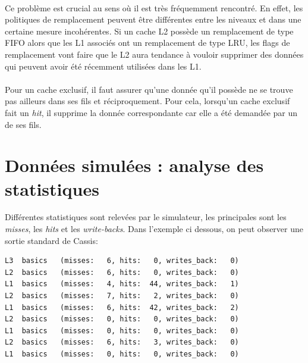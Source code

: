 \paragraph{}
Ce problème est crucial au sens où il est très fréquemment rencontré. En effet, les politiques de remplacement peuvent être différentes entre les niveaux et dans une certaine mesure incohérentes. Si un cache L2 possède un remplacement de type FIFO alors que les L1 associés ont un remplacement de type LRU, les flags de remplacement vont faire que le L2 aura tendance à vouloir supprimer des données qui peuvent avoir été récemment utilisées dans les L1.

\paragraph{}
Pour un cache exclusif, il faut assurer qu'une donnée qu'il possède ne se trouve pas ailleurs dans ses fils et réciproquement. Pour cela, lorsqu'un cache exclusif fait un \emph{hit}, il supprime la donnée correspondante car elle a été demandée par un de ses fils.

\section{Données simulées : analyse des statistiques}

Différentes statistiques sont relevées par le simulateur, les principales sont les \emph{misses}, les \emph{hits} et les \emph{write-backs}. Dans l'exemple ci dessous, on peut observer une sortie standard de \textsf{Cassis}:
\begin{lstlisting}
L3  basics   (misses:   6, hits:   0, writes_back:   0)
L2  basics   (misses:   6, hits:   0, writes_back:   0)
L1  basics   (misses:   4, hits:  44, writes_back:   1)
L2  basics   (misses:   7, hits:   2, writes_back:   0)
L1  basics   (misses:   6, hits:  42, writes_back:   2)
L2  basics   (misses:   0, hits:   0, writes_back:   0)
L1  basics   (misses:   0, hits:   0, writes_back:   0)
L2  basics   (misses:   6, hits:   3, writes_back:   0)
L1  basics   (misses:   0, hits:   0, writes_back:   0)
\end{lstlisting}


